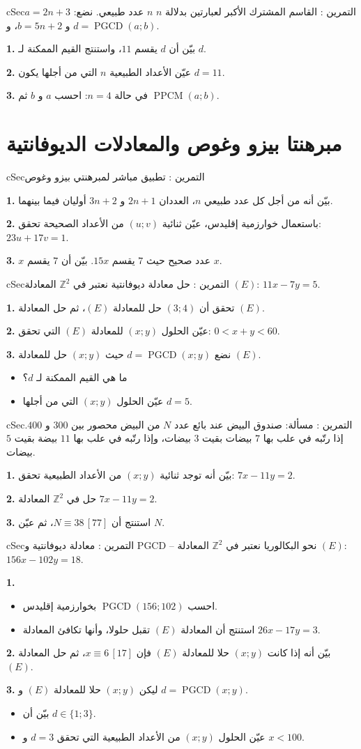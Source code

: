 \documentclass[12pt,a4paper]{article}
\newenvironment{BOX}[2]{\begin{otherlanguage}{english}\begin{arbox}{#1}{#2}}{\end{arbox}\end{otherlanguage}}
\newcounter{exo}
\newenvironment{tamrin}[1]{\stepcounter{exo}\begin{BOX}{cSec}{التمرين \theexo: #1}}{\end{BOX}}
\newcommand{\Z}{\mathbb{Z}}
\newcommand{\pgcd}{\operatorname{PGCD}}
\newcommand{\ppcm}{\operatorname{PPCM}}
\newenvironment{sq}{\begin{itemize}[leftmargin=2.4em,itemsep=3pt]}{\end{itemize}}
\newcommand{\qa}{\item[(أ)]}\newcommand{\qb}{\item[(ب)]}\newcommand{\qc}{\item[(جـ)]}\newcommand{\qd}{\item[(د)]}\newcommand{\qe}{\item[(هـ)]}
\newcommand{\QQ}[1]{\par\smallskip\textbf{#1.} }
\begin{document}
\begin{tamrin}{القاسم المشترك الأكبر لعبارتين بدلالة $n$}
$n$ عدد طبيعي. نضع: $a=2n+3$ و $b=5n+2$، و $d=\pgcd(a;b)$.
\QQ{1} بيّن أن $d$ يقسم $11$، واستنتج القيم الممكنة لـ $d$.
\QQ{2} عيّن الأعداد الطبيعية $n$ التي من أجلها يكون $d=11$.
\QQ{3} في حالة $n=4$: احسب $a$ و $b$ ثم $\ppcm(a;b)$.
\end{tamrin}

\section{مبرهنتا بيزو وغوص والمعادلات الديوفانتية}

\begin{tamrin}{تطبيق مباشر لمبرهنتي بيزو وغوص}
\QQ{1} بيّن أنه من أجل كل عدد طبيعي $n$، العددان $2n+1$ و $3n+2$ أوليان فيما بينهما.
\QQ{2} باستعمال خوارزمية إقليدس، عيّن ثنائية $(u;v)$ من الأعداد الصحيحة تحقق: $23u+17v=1$.
\QQ{3} $x$ عدد صحيح حيث $7$ يقسم $15x$. بيّن أن $7$ يقسم $x$.
\end{tamrin}

\begin{tamrin}{حل معادلة ديوفانتية}
نعتبر في $\Z^2$ المعادلة $(E)$: $11x-7y=5$.
\QQ{1} تحقق أن $(3;4)$ حل للمعادلة $(E)$، ثم حل المعادلة $(E)$.
\QQ{2} عيّن الحلول $(x;y)$ للمعادلة $(E)$ التي تحقق: $0<x+y<60$.
\QQ{3} نضع $d=\pgcd(x;y)$ حيث $(x;y)$ حل للمعادلة $(E)$.
\begin{sq}
\qa ما هي القيم الممكنة لـ $d$؟
\qb عيّن الحلول $(x;y)$ التي من أجلها $d=5$.
\end{sq}
\end{tamrin}

\begin{tamrin}{مسألة: صندوق البيض}
عند بائع عدد $N$ من البيض محصور بين $300$ و $400$. إذا رتّبه في علب بها $7$ بيضات بقيت $3$ بيضات، وإذا رتّبه في علب بها $11$ بيضة بقيت $5$ بيضات.
\QQ{1} بيّن أنه توجد ثنائية $(x;y)$ من الأعداد الطبيعية تحقق: $7x-11y=2$.
\QQ{2} حل في $\Z^2$ المعادلة $7x-11y=2$.
\QQ{3} استنتج أن $N\equiv 38\,[77]$، ثم عيّن $N$.
\end{tamrin}

\begin{tamrin}{معادلة ديوفانتية و PGCD -- نحو البكالوريا}
نعتبر في $\Z^2$ المعادلة $(E)$: $156x-102y=18$.
\QQ{1}
\begin{sq}
\qa احسب $\pgcd(156;102)$ بخوارزمية إقليدس.
\qb استنتج أن المعادلة $(E)$ تقبل حلولا، وأنها تكافئ المعادلة $26x-17y=3$.
\end{sq}
\QQ{2} بيّن أنه إذا كانت $(x;y)$ حلا للمعادلة $(E)$ فإن $x\equiv 6\,[17]$، ثم حل المعادلة $(E)$.
\QQ{3} ليكن $(x;y)$ حلا للمعادلة $(E)$ و $d=\pgcd(x;y)$.
\begin{sq}
\qa بيّن أن $d\in\{1;3\}$.
\qb عيّن الحلول $(x;y)$ من الأعداد الطبيعية التي تحقق $d=3$ و $x<100$.
\end{sq}
\end{tamrin}
\end{document}
